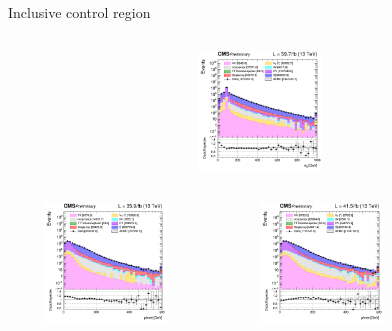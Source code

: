\documentclass[8pt]{beamer}
\begin{document}
\begin{frame}{Inclusive control region}
\begin{columns}
\begin{column}{0.33\textwidth}
\begin{center}
			\begin{block}{}\end{block}\vspace{10pt}
     			\includegraphics[width=1.0\textwidth, height=90pt]{figs/2018/log_cratio_inclusiveCR_ll_mll.png}
    		\end{center}		
		\end{column}
\end{columns}
\begin{columns}
		\begin{column}{0.33\textwidth}
			\begin{center}
     			\includegraphics[width=1.0\textwidth, height=90pt]{figs/2016/log_cratio_inclusiveCR_ll_METcorrected_pt.png}
    		\end{center}		
		\end{column}
		\begin{column}{0.33\textwidth}
			\begin{center}
     			\includegraphics[width=1.0\textwidth, height=90pt]{figs/2017/log_cratio_inclusiveCR_ll_METcorrected_pt.png}
    		\end{center}		
		\end{column}
		\begin{column}{0.33\textwidth}

\end{column}
\end{columns}
\end{frame}
\end{document}
